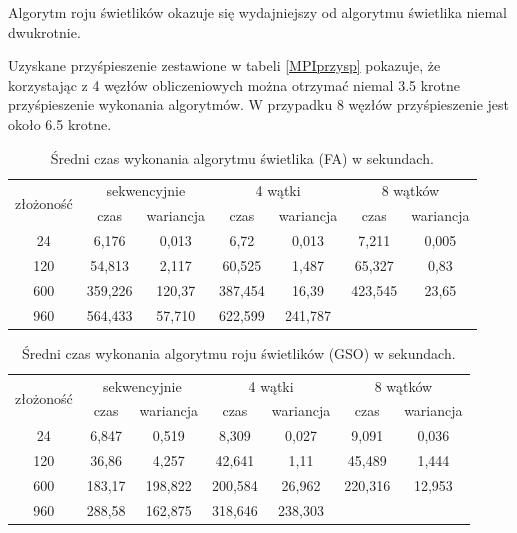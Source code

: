 \documentclass[11pt,a4paper,twoside]{article}
\begin{document}
Algorytm roju świetlików okazuje się wydajniejszy od algorytmu świetlika niemal dwukrotnie. 

Uzyskane przyśpieszenie zestawione w tabeli \ref{MPIprzysp} pokazuje, że korzystając z 4 węzłów obliczeniowych można otrzymać niemal 3.5 krotne przyśpieszenie wykonania algorytmów. W przypadku 8 węzłów przyśpieszenie jest około 6.5 krotne.

\bgroup
\def\arraystretch{1.1}
\begin{table}[ht]
\caption{Średni czas wykonania algorytmu świetlika (FA) w sekundach.}
\label{MPIwspólnaFA}
\centering
\begin{tabular}{|c||c|c||c|c||c|c|}
\hline
 \multirow{2}{*}{złożoność} & \multicolumn{2}{c||}{sekwencyjnie} & \multicolumn{2}{c||}{4 wątki} & \multicolumn{2}{c|}{8 wątków} \\\cline{2-7}
 & czas & wariancja & czas & wariancja & czas & wariancja \\\hline
 24 & 6,176 & 0,013 & 6,72 & 0,013 & 7,211 & 0,005\\\hline
 120 & 54,813 & 2,117 & 60,525 & 1,487 & 65,327 & 0,83 \\\hline
 600 & 359,226 & 120,37 & 387,454 & 16,39 & 423,545 & 23,65 \\\hline
 960 & 564,433 & 57,710 & 622,599 & 241,787 & & \\\hline
\end{tabular}
\end{table}
\egroup



\bgroup
\def\arraystretch{1.1}
\begin{table}[ht]
\caption{Średni czas wykonania algorytmu roju świetlików (GSO) w sekundach.}
\label{MPIwspólnaGSO}
\centering
\begin{tabular}{|c||c|c||c|c||c|c|}
\hline
 \multirow{2}{*}{złożoność} & \multicolumn{2}{c||}{sekwencyjnie} & \multicolumn{2}{c||}{4 wątki} & \multicolumn{2}{c|}{8 wątków} \\\cline{2-7}
 & czas & wariancja & czas & wariancja & czas & wariancja \\\hline
 24 & 6,847 & 0,519 & 8,309 & 0,027 & 9,091 & 0,036 \\\hline
 120 & 36,86 & 4,257 & 42,641 & 1,11 & 45,489 & 1,444 \\\hline
 600 & 183,17 & 198,822 & 200,584 & 26,962 & 220,316 & 12,953 \\\hline
 960 & 288,58 & 162,875 & 318,646 & 238,303 &  & \\\hline
\end{tabular}
\end{table}
\egroup
\vspace*{1\baselineskip}
\end{document}
